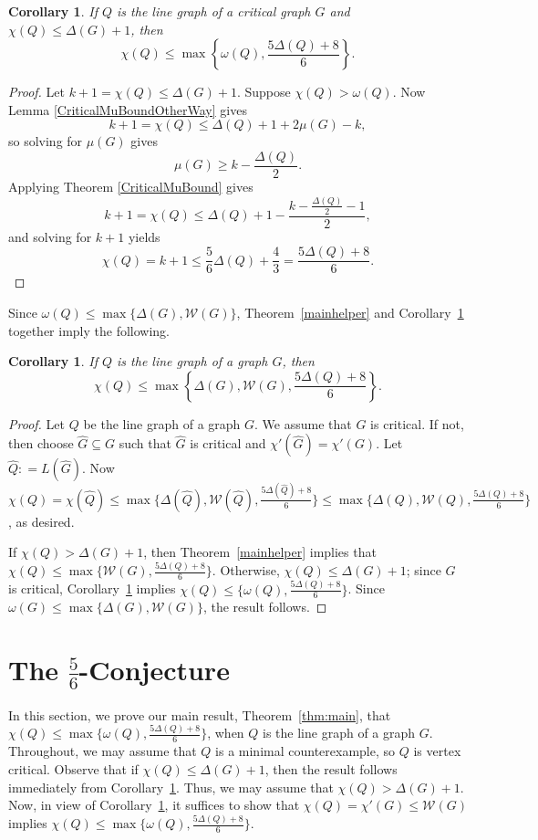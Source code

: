 \documentclass[12pt]{article}
\theoremstyle{plain}
\newtheorem{cor}[thm]{Corollary}
\theoremstyle{definition}
\theoremstyle{remark}
\newcommand{\fancy}[1]{\mathcal{#1}}
\newcommand{\W}{\fancy{W}}
\newcommand{\set}[1]{\left\{ #1 \right\}}
\newcommand{\DefinedAs}{\mathrel{\mathop:}=}
\def\aftermath{\par\vspace{-\belowdisplayskip}\vspace{-\parskip}\vspace{-\baselineskip}}
\begin{document}
\begin{cor}
If $Q$ is the line graph of a critical graph $G$ and $\chi(Q) \le \Delta(G) + 1$, then
\[\chi(Q) \le \max\set{\omega(Q), \frac{5\Delta(Q) + 8}{6}}.\]
\label{mainCorHelper}
\end{cor}
\begin{proof}
Let $k +1=\chi(Q) \le \Delta(G)+1$.  Suppose $\chi(Q) > \omega(Q)$.  Now Lemma
\ref{CriticalMuBoundOtherWay} gives
\[k + 1 = \chi(Q) \le \Delta(Q) + 1 + 2\mu(G) - k,\]
so solving for $\mu(G)$ gives
\[\mu(G) \ge k - \frac{\Delta(Q)}{2}.\]
Applying Theorem \ref{CriticalMuBound} gives
\[k+1 = \chi(Q) \le \Delta(Q) + 1 - \frac{k - \frac{\Delta(Q)}{2} - 1}{2},\]
and solving for $k+1$ yields
\[\chi(Q) = k+1 \le \frac56\Delta(Q) + \frac43 = \frac{5\Delta(Q) + 8}{6}.\]
\aftermath
\end{proof}

Since $\omega(Q) \le \max\{\Delta(G),\W(G)\}$, Theorem~\ref{mainhelper} and
Corollary~\ref{mainCorHelper} together imply the following.

\begin{cor}
If $Q$ is the line graph of a graph $G$, then
\[\chi(Q) \le \max\set{\Delta(G),\W(G), \frac{5\Delta(Q) + 8}{6}}.\]
\label{mainCor}
\end{cor}
\begin{proof}
Let $Q$ be the line graph of a graph $G$.  
We assume that $G$ is critical.  
If not, then choose $\widehat{G}\subseteq G$ such that $\widehat{G}$ is critical
and $\chi'(\widehat{G})=\chi'(G)$.  Let $\widehat{Q}\DefinedAs L(\widehat{G})$. 
Now $\chi(Q)=\chi(\widehat{Q}) \le
\max\{\Delta(\widehat{Q}),\W(\widehat{Q}),\frac{5\Delta(\widehat{Q})+8}6\}
\le\max\{\Delta(Q),\W(Q),\frac{5\Delta(Q)+8}6\}$, as desired.

If $\chi(Q) >\Delta(G)+1$, then Theorem~\ref{mainhelper} implies that
$\chi(Q)\le\max\{\W(G),\frac{5\Delta(Q)+8}6\}$.  Otherwise, $\chi(Q)\le
\Delta(G)+1$; since $G$ is critical, Corollary~\ref{mainCorHelper} implies 
$\chi(Q)\le\{\omega(Q),\frac{5\Delta(Q)+8}6\}$.  Since
$\omega(G)\le\max\{\Delta(G),\W(G)\}$, the result follows.
\end{proof}


\section{The $\frac56$-Conjecture}
\label{sec:final}

In this section, we prove our main result, Theorem~\ref{thm:main}, 
that $\chi(Q)\le\max\{\omega(Q),\frac{5\Delta(Q)+8}6\}$, when $Q$ is the line
graph of a graph $G$.
Throughout, we may assume that $Q$ is a minimal counterexample, so $Q$ is vertex
critical.
Observe that if $\chi(Q)\le \Delta(G)+1$, then the result follows immediately
from Corollary~\ref{mainCorHelper}.  Thus, we may assume that
$\chi(Q)>\Delta(G)+1$.  Now, in view of Corollary~\ref{mainCor}, it suffices to
show that $\chi(Q)=\chi'(G)\le \W(G)$ implies
$\chi(Q)\le\max\{\omega(Q),\frac{5\Delta(Q)+8}6\}$.
\end{document}
